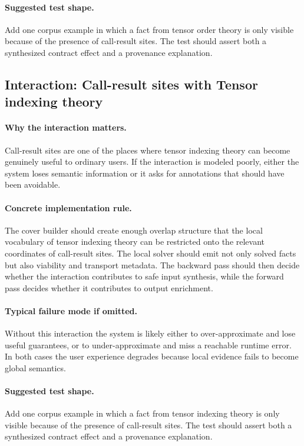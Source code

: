 \documentclass[11pt]{report}
\theoremstyle{definition}
\theoremstyle{plain}
\begin{document}
\paragraph{Suggested test shape.}
Add one corpus example in which a fact from tensor order theory is only
visible because of the presence of call-result sites. The test should
assert both a synthesized contract effect and a provenance explanation.

\subsection{Interaction: Call-result sites with Tensor indexing theory}

\paragraph{Why the interaction matters.}
Call-result sites are one of the places where tensor indexing theory can become
genuinely useful to ordinary users. If the interaction is modeled poorly,
either the system loses semantic information or it asks for annotations that
should have been avoidable.

\paragraph{Concrete implementation rule.}
The cover builder should create enough overlap structure that the local
vocabulary of tensor indexing theory can be restricted onto the relevant
coordinates of call-result sites. The local solver should emit not only
solved facts but also viability and transport metadata. The backward pass
should then decide whether the interaction contributes to safe input
synthesis, while the forward pass decides whether it contributes to output
enrichment.

\paragraph{Typical failure mode if omitted.}
Without this interaction the system is likely either to over-approximate and
lose useful guarantees, or to under-approximate and miss a reachable runtime
error. In both cases the user experience degrades because local evidence
fails to become global semantics.

\paragraph{Suggested test shape.}
Add one corpus example in which a fact from tensor indexing theory is only
visible because of the presence of call-result sites. The test should
assert both a synthesized contract effect and a provenance explanation.
\end{document}
